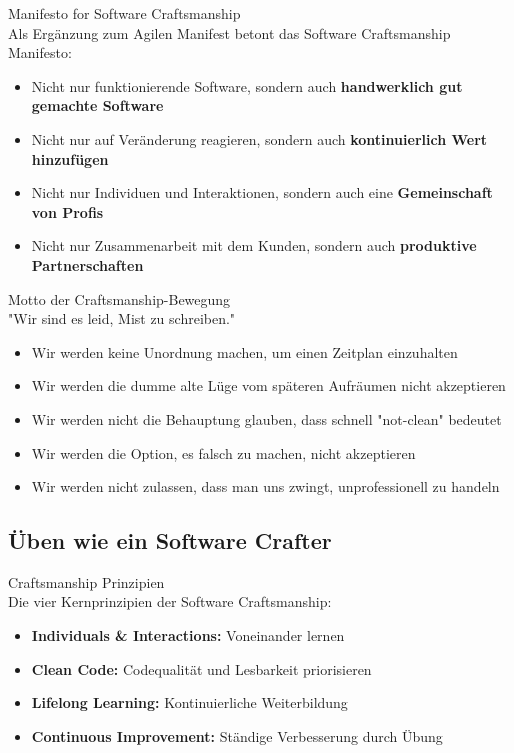 \begin{definition}{Manifesto for Software Craftsmanship}\\
    Als Ergänzung zum Agilen Manifest betont das Software Craftsmanship Manifesto:
    \begin{itemize}
        \item Nicht nur funktionierende Software, sondern auch \textbf{handwerklich gut gemachte Software}
        \item Nicht nur auf Veränderung reagieren, sondern auch \textbf{kontinuierlich Wert hinzufügen}
        \item Nicht nur Individuen und Interaktionen, sondern auch eine \textbf{Gemeinschaft von Profis}
        \item Nicht nur Zusammenarbeit mit dem Kunden, sondern auch \textbf{produktive Partnerschaften}
    \end{itemize}
\end{definition}

\begin{concept}{Motto der Craftsmanship-Bewegung}\\
    "Wir sind es leid, Mist zu schreiben."
    \begin{itemize}
        \item Wir werden keine Unordnung machen, um einen Zeitplan einzuhalten
        \item Wir werden die dumme alte Lüge vom späteren Aufräumen nicht akzeptieren
        \item Wir werden nicht die Behauptung glauben, dass schnell "not-clean" bedeutet
        \item Wir werden die Option, es falsch zu machen, nicht akzeptieren
        \item Wir werden nicht zulassen, dass man uns zwingt, unprofessionell zu handeln
    \end{itemize}
\end{concept}

\subsection{Üben wie ein Software Crafter}

\begin{concept}{Craftsmanship Prinzipien}\\
    Die vier Kernprinzipien der Software Craftsmanship:
    \begin{itemize}
        \item \textbf{Individuals \& Interactions:} Voneinander lernen
        \item \textbf{Clean Code:} Codequalität und Lesbarkeit priorisieren
        \item \textbf{Lifelong Learning:} Kontinuierliche Weiterbildung
        \item \textbf{Continuous Improvement:} Ständige Verbesserung durch Übung
    \end{itemize}
\end{concept}


